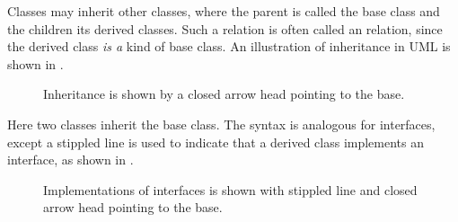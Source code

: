 Classes may inherit other classes, where the parent is called the base class and the children its derived classes. Such a relation is often called an  relation, since the derived class \emph{is a} kind of base class. An illustration of inheritance in UML is shown in .
\begin{figure}
  \centering
  \caption{Inheritance is shown by a closed arrow head pointing to the base.}
  \label{fig:inherit}
\end{figure}
Here two classes inherit the base class. The syntax is analogous for interfaces, except a stippled line is used to indicate that a derived class implements an interface, as shown in .
\begin{figure}
  \centering
  \caption{Implementations of interfaces is shown with stippled line and closed arrow head pointing to the base.}
  \label{fig:implement}
\end{figure}

